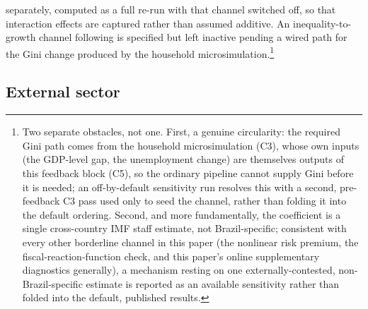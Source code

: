 \documentclass[11pt,a4paper]{article}
\begin{document}
separately, computed as a full re-run with that channel switched off, so that interaction effects are captured rather than assumed additive. An inequality-to-growth channel following \citet{ostrybergtsangarides2014} is specified but left inactive pending a wired path for the Gini change produced by the household microsimulation.\footnote{Two separate obstacles, not one. First, a genuine circularity: the required Gini path comes from the household microsimulation (\textsc{C3}), whose own inputs (the GDP-level gap, the unemployment change) are themselves outputs of this feedback block (\textsc{C5}), so the ordinary pipeline cannot supply Gini before it is needed; an off-by-default sensitivity run resolves this with a second, pre-feedback \textsc{C3} pass used only to seed the channel, rather than folding it into the default ordering. Second, and more fundamentally, the \citet{ostrybergtsangarides2014} coefficient is a single cross-country IMF staff estimate, not Brazil-specific; consistent with every other borderline channel in this paper (the nonlinear risk premium, the fiscal-reaction-function check, and this paper's online supplementary diagnostics generally), a mechanism resting on one externally-contested, non-Brazil-specific estimate is reported as an available sensitivity rather than folded into the default, published results.}

\subsection{External sector}
\end{document}
